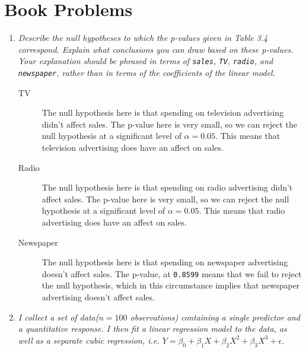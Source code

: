 \documentclass[11pt]{article}
\begin{document}
    
    
\bigskip

\section*{Book Problems}


\begin{enumerate}
	\item \textit{Describe the null hypotheses to which the p-values given in Table 3.4 correspond. Explain what conclusions you can draw based on these p-values. Your explanation should be phrased in terms of \texttt{sales}, \texttt{TV}, \texttt{radio}, and \texttt{newspaper}, rather than in terms of the coefficients of the linear model.}

    \begin{description}
        \item[TV] The null hypothesis here is that spending on television advertising didn't affect sales. The p-value here is very small, so we can reject the null hypothesis at a significant level of $\alpha=0.05.$ This means that television advertising does have an affect on sales. 

        \item[Radio] The null hypothesis here is that spending on radio advertising didn't affect sales. The p-value here is very small, so we can reject the null hypothesis at a significant level of $\alpha=0.05.$ This means that radio advertising does have an affect on sales. 

        \item[Newspaper] The null hypothesis here is that spending on newspaper advertising doesn't affect sales. The p-value, at \texttt{0.8599} means that we fail to reject the null hypothesis, which in this circumstance implies that newspaper advertising doesn't affect sales.
         
    \end{description}
	
  	\setcounter{enumi}{3}

    \item \textit{I collect a set of data($n = 100$ observations) containing a single predictor and a quantitative response. I then fit a linear regression model to the data, as well as a separate cubic regression, i.e. $Y = \beta_0 + \beta_1X + \beta_2X^2 + \beta_3X^3 + \epsilon.$}


\end{enumerate}
\end{document}
